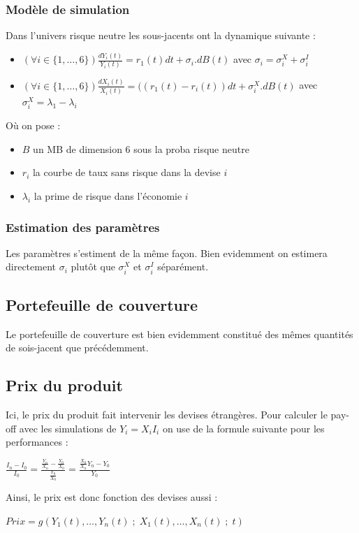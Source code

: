 \documentclass[a4paper,12pt]{article}
\begin{document}
\subsubsection{Modèle de simulation}
Dans l'univers risque neutre les sous-jacents ont la dynamique suivante : 
\begin{itemize}[label=$\star$]
\item $\left(\forall i\in\{1,\ldots,6\}\right) \frac{dY_i(t)}{Y_i(t)}=r_1(t)dt + \sigma_i.dB(t)$ avec $\sigma_i=\sigma^X_i+\sigma^I_i$
\item $\left(\forall i\in\{1,\ldots,6\}\right) \frac{dX_i(t)}{X_i(t)}=((r_1(t)-r_i(t))dt+\sigma^X_i.dB(t)$ avec $\sigma^X_i= \lambda_1-\lambda_i$
\end{itemize}
Où on pose : 
\begin{itemize}[label=$\bullet$]
\item $B$ un MB de dimension $6$ sous la proba risque neutre
\item $r_i$ la courbe de taux sans risque dans la devise $i$
\item $\lambda_i$ la prime de risque dans l'économie $i$
\end{itemize}
\subsubsection{Estimation des paramètres}
Les paramètres s'estiment de la même façon. Bien evidemment on estimera directement $\sigma_i$ plutôt que $\sigma^X_i$ et $\sigma^I_i$ séparément. 
\subsection{Portefeuille de couverture}
Le portefeuille de couverture est bien evidemment constitué des mêmes quantités de sois-jacent que précédemment.
\subsection{Prix du produit}
Ici, le prix du produit fait intervenir les devises étrangères. Pour calculer le pay-off avec les simulations de $Y_i=X_iI_i$ on use de la formule suivante pour les performances : 
\begin{center}
$\frac{I_n-I_0}{I_0}=\frac{\frac{Y_n}{X_n}-\frac{Y_0}{X_0}}{\frac{Y_0}{X_0}}=\frac{\frac{X_0}{X_n}Y_n-Y_0}{Y_0}$
\end{center}
Ainsi, le prix est donc fonction des devises aussi : 
\begin{center}
$Prix = g(Y_1(t),\ldots,Y_n(t)\;;\;X_1(t),\ldots,X_n(t)\;;\;t)$
\end{center}
\newpage
\end{document}
